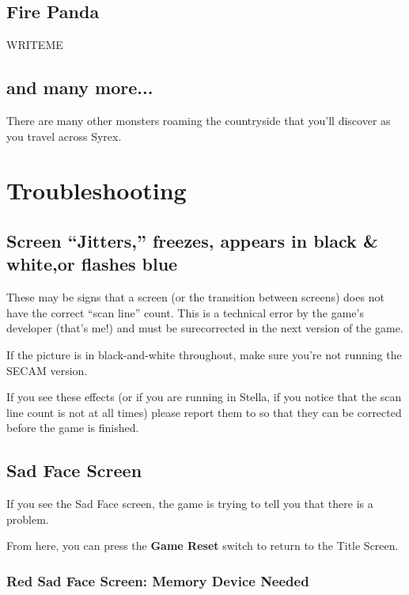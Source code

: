 \documentclass[10pt,twocolumn,openany,article]{memoir}
\begin{document}
\begin{description}
\section*{Fire Panda}
WRITEME

\section*{and many more...}
There  are  many other  monsters  roaming  the countryside  that  you'll
discover as you travel across Syrex.

\chapter{Troubleshooting}

\ifdefined\DEMO

\section{Screen ``Jitters,'' freezes,  \ifdefined\TVPAL appears in black
  \& white,\fi or flashes blue}

These may  be signs that  a screen  (or the transition  between screens)
does not have the correct ``scan line'' count. This is a technical error
by the game's  developer (that's me!) and must be  surecorrected in the next
version of the game.

\ifdefined\TVPAL
If the  picture is in  black-and-white throughout, make sure  you're not
running the SECAM version.
\fi

If you see these effects (or if you are running in Stella, if you notice
that the scan  line count is not \ifdefined{}   \fi at
all         times)         please         report         them         to
 so  that they
can be corrected before the game is finished.

\fi

\section{Sad Face Screen}

If you  see the Sad  Face screen,  the game is  trying to tell  you that
there is a problem.

From here, you can press the \textbf{Game Reset} switch to return to the
Title Screen.

\ifdefined\NOSAVE\else

\subsection{Red Sad Face Screen: Memory Device Needed}


\end{description}
\end{document}
